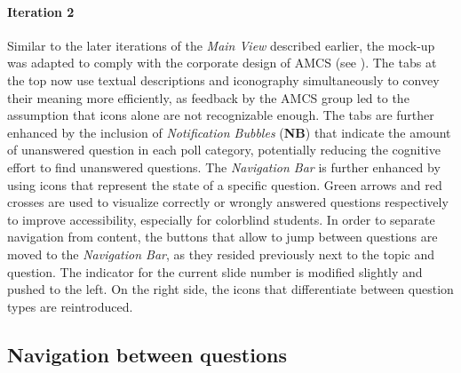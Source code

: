 \paragraph{Iteration 2}
Similar to the later iterations of the \emph{Main View} described earlier, the mock-up was adapted to comply with the corporate design of AMCS (see ).
The tabs at the top now use textual descriptions and iconography simultaneously to convey their meaning more efficiently, as feedback by the AMCS group led to the assumption that icons alone are not recognizable enough. The tabs are further enhanced by the inclusion of \emph{Notification Bubbles} (\textbf{NB}) that indicate the amount of unanswered question in each poll category, potentially reducing the cognitive effort to find unanswered questions.
The \emph{Navigation Bar} is further enhanced by using icons that represent the state of a specific question. Green arrows and red crosses are used to visualize correctly or wrongly answered questions respectively to improve accessibility, especially for colorblind students.
In order to separate navigation from content, the buttons that allow to jump between questions are moved to the \emph{Navigation Bar}, as they resided previously next to the topic and question.
The indicator for the current slide number is modified slightly and pushed to the left. On the right side, the icons that differentiate between question types are reintroduced. 
\subsection{Navigation between questions}

